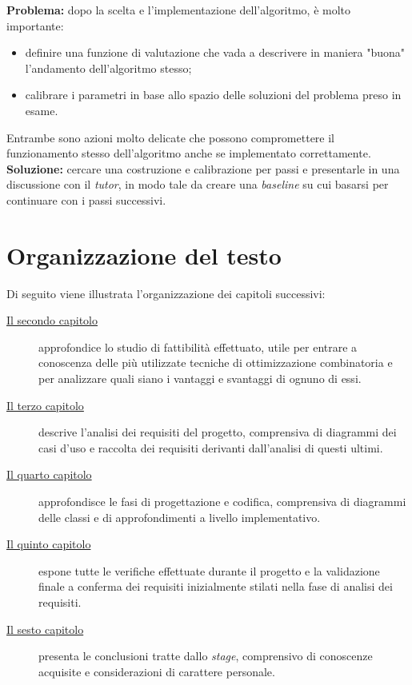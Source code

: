 \begin{enumerate}
    \textbf{Problema:} dopo la scelta e l'implementazione dell'algoritmo, è molto importante:
    \begin{itemize}
        \item definire una funzione di valutazione che vada a descrivere in maniera "buona" l'andamento dell'algoritmo stesso;
        \item calibrare i parametri in base allo spazio delle soluzioni del problema preso in esame.
    \end{itemize}
    Entrambe sono azioni molto delicate che possono compromettere il funzionamento stesso dell'algoritmo anche
    se implementato correttamente.\\[0.2cm]
    \textbf{Soluzione:} cercare una costruzione e calibrazione per passi e presentarle in una discussione con il \textit{tutor},
    in modo tale da creare una \textit{baseline} su cui basarsi per continuare con i passi successivi.

\end{enumerate}

\noindent
\section{Organizzazione del testo}
\noindent Di seguito viene illustrata l'organizzazione dei capitoli successivi:
\begin{description}
    \item[{\hyperref[cap:studio-fattibilita]{Il secondo capitolo}}] 
    approfondice lo studio di fattibilità effettuato, utile per entrare a conoscenza
    delle più utilizzate tecniche di ottimizzazione combinatoria e per analizzare
    quali siano i vantaggi e svantaggi di ognuno di essi.
    
    \item[{\hyperref[cap:analisi-requisiti]{Il terzo capitolo}}]
    descrive l'analisi dei requisiti del progetto, comprensiva di diagrammi dei
    casi d'uso e raccolta dei requisiti derivanti dall'analisi di questi ultimi.
    
    \item[{\hyperref[cap:progettazione-codifica]{Il quarto capitolo}}]
    approfondisce le fasi di progettazione e codifica, comprensiva di diagrammi delle classi
    e di approfondimenti a livello implementativo.
    
    \item[{\hyperref[cap:verifica-validazione]{Il quinto capitolo}}]
    espone tutte le verifiche effettuate durante il progetto e la validazione
    finale a conferma dei requisiti inizialmente stilati nella fase di
    analisi dei requisiti.
    
    \item[{\hyperref[cap:conclusioni]{Il sesto capitolo}}]
    presenta le conclusioni tratte dallo \textit{stage}, comprensivo di conoscenze
    acquisite e considerazioni di carattere personale.
\end{description}
